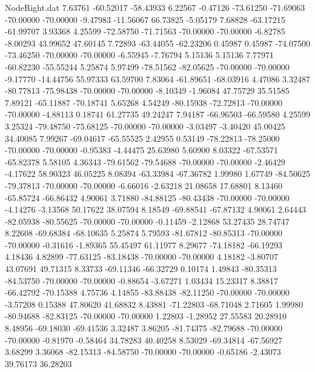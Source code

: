 \begin{filecontents}{NodeRight.dat}
   7.63761  -60.52017  -58.43933     6.22567   -0.47126  -73.61250  -71.69063  -70.00000  -70.00000   -9.47983  -11.56067   66.73825   -5.05179
   7.68828  -63.17215  -61.99707     3.93368    4.25599  -72.58750  -71.71563  -70.00000  -70.00000   -6.82785   -8.00293   43.99652   47.60145
   7.72893  -63.44055  -62.23206     0.45987    0.45987  -74.07500  -73.46250  -70.00000  -70.00000   -6.55945   -7.76794    5.15136    5.15136
   7.77971  -60.82230  -55.55244     5.25874    5.97499  -78.51562  -82.05625  -70.00000  -70.00000   -9.17770  -14.44756   55.97333   63.59700
   7.83064  -61.89651  -68.03916     4.47086    3.32487  -80.77813  -75.98438  -70.00000  -70.00000   -8.10349   -1.96084   47.75729   35.51585
   7.89121  -65.11887  -70.18741     5.65268    4.54249  -80.15938  -72.72813  -70.00000  -70.00000   -4.88113    0.18741   61.27735   49.24247
   7.94187  -66.96503  -66.59580     4.25599    3.25324  -79.48750  -75.68125  -70.00000  -70.00000   -3.03497   -3.40420   45.00425   34.40085
   7.99267  -69.04617  -65.55525     2.42955    0.53149  -78.22813  -78.25000  -70.00000  -70.00000   -0.95383   -4.44475   25.63980    5.60900
   8.03322  -67.53571  -65.82378     5.58105    4.36343  -79.61562  -79.54688  -70.00000  -70.00000   -2.46429   -4.17622   58.90323   46.05225
   8.08394  -63.33984  -67.36782     1.99980    1.67749  -84.50625  -79.37813  -70.00000  -70.00000   -6.66016   -2.63218   21.08658   17.68801
   8.13460  -65.85724  -66.86432     4.90061    3.71880  -84.88125  -80.43438  -70.00000  -70.00000   -4.14276   -3.13568   50.17622   38.07594
   8.18549  -69.88541  -67.87132     4.90061    2.64443  -82.05938  -80.55625  -70.00000  -70.00000   -0.11459   -2.12868   53.27435   28.74747
   8.22608  -69.68384  -68.10635     5.25874    5.79593  -81.67812  -80.85313  -70.00000  -70.00000   -0.31616   -1.89365   55.45497   61.11977
   8.29677  -74.18182  -66.19293     4.18436    4.82899  -77.63125  -83.18438  -70.00000  -70.00000    4.18182   -3.80707   43.07691   49.71315
   8.33733  -69.11346  -66.32729     0.10174    1.49843  -80.35313  -84.53750  -70.00000  -70.00000   -0.88654   -3.67271    1.03434   15.23317
   8.38817  -66.42792  -70.15388     4.75736    4.14855  -83.88438  -82.11250  -70.00000  -70.00000   -3.57208    0.15388   47.80620   41.68832
   8.43881  -71.22803  -68.71048     2.71605    1.99980  -80.94688  -82.83125  -70.00000  -70.00000    1.22803   -1.28952   27.55583   20.28910
   8.48956  -69.18030  -69.41536     3.32487    3.86205  -81.74375  -82.79688  -70.00000  -70.00000   -0.81970   -0.58464   34.78283   40.40258
   8.53029  -69.34814  -67.56927     3.68299    3.36068  -82.15313  -84.58750  -70.00000  -70.00000   -0.65186   -2.43073   39.76173   36.28203

\end{filecontents}
